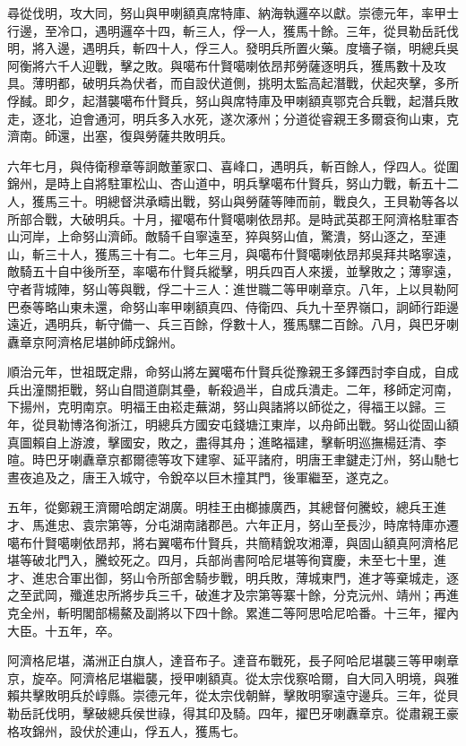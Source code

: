 \begin{pinyinscope}
尋從伐明，攻大同，努山與甲喇額真席特庫、納海執邏卒以獻。崇德元年，率甲士行邊，至冷口，遇明邏卒十四，斬三人，俘一人，獲馬十餘。三年，從貝勒岳託伐明，將入邊，遇明兵，斬四十人，俘三人。發明兵所置火藥。度墻子嶺，明總兵吳阿衡將六千人迎戰，擊之敗。與噶布什賢噶喇依昂邦勞薩逐明兵，獲馬數十及攻具。薄明都，破明兵為伏者，而自設伏道側，挑明太監高起潛戰，伏起夾擊，多所俘馘。即夕，起潛襲噶布什賢兵，努山與席特庫及甲喇額真鄂克合兵戰，起潛兵敗走，逐北，迫會通河，明兵多入水死，遂次涿州；分道從睿親王多爾袞徇山東，克濟南。師還，出塞，復與勞薩共敗明兵。

六年七月，與侍衛穆章等詗敵董家口、喜峰口，遇明兵，斬百餘人，俘四人。從圍錦州，是時上自將駐軍松山、杏山道中，明兵擊噶布什賢兵，努山力戰，斬五十二人，獲馬三十。明總督洪承疇出戰，努山與勞薩等陣而前，戰良久，王貝勒等各以所部合戰，大破明兵。十月，擢噶布什賢噶喇依昂邦。是時武英郡王阿濟格駐軍杏山河岸，上命努山濟師。敵騎千自寧遠至，猝與努山值，驚潰，努山逐之，至連山，斬三十人，獲馬三十有二。七年三月，與噶布什賢噶喇依昂邦吳拜共略寧遠，敵騎五十自中後所至，率噶布什賢兵縱擊，明兵四百人來援，並擊敗之；薄寧遠，守者背城陣，努山等與戰，俘二十三人：進世職二等甲喇章京。八年，上以貝勒阿巴泰等略山東未還，命努山率甲喇額真四、侍衛四、兵九十至界嶺口，詗師行距邊遠近，遇明兵，斬守備一、兵三百餘，俘數十人，獲馬騾二百餘。八月，與巴牙喇纛章京阿濟格尼堪帥師戍錦州。

順治元年，世祖既定鼎，命努山將左翼噶布什賢兵從豫親王多鐸西討李自成，自成兵出潼關拒戰，努山自間道劘其壘，斬殺過半，自成兵潰走。二年，移師定河南，下揚州，克明南京。明福王由崧走蕪湖，努山與諸將以師從之，得福王以歸。三年，從貝勒博洛徇浙江，明總兵方國安屯錢塘江東岸，以舟師出戰。努山從固山額真圖賴自上游渡，擊國安，敗之，盡得其舟；進略福建，擊斬明巡撫楊廷清、李暄。時巴牙喇纛章京都爾德等攻下建寧、延平諸府，明唐王聿鍵走汀州，努山馳七晝夜追及之，唐王入城守，令銳卒以巨木撞其門，後軍繼至，遂克之。

五年，從鄭親王濟爾哈朗定湖廣。明桂王由榔據廣西，其總督何騰蛟，總兵王進才、馬進忠、袁宗第等，分屯湖南諸郡邑。六年正月，努山至長沙，時席特庫亦遷噶布什賢噶喇依昂邦，將右翼噶布什賢兵，共簡精銳攻湘潭，與固山額真阿濟格尼堪等破北門入，騰蛟死之。四月，兵部尚書阿哈尼堪等徇寶慶，未至七十里，進才、進忠合軍出御，努山令所部舍騎步戰，明兵敗，薄城東門，進才等棄城走，逐之至武岡，殲進忠所將步兵三千，破進才及宗第等寨十餘，分克沅州、靖州；再進克全州，斬明閣部楊鰲及副將以下四十餘。累進二等阿思哈尼哈番。十三年，擢內大臣。十五年，卒。

阿濟格尼堪，滿洲正白旗人，達音布子。達音布戰死，長子阿哈尼堪襲三等甲喇章京，旋卒。阿濟格尼堪繼襲，授甲喇額真。從太宗伐察哈爾，自大同入明境，與雅賴共擊敗明兵於崞縣。崇德元年，從太宗伐朝鮮，擊敗明寧遠守邊兵。三年，從貝勒岳託伐明，擊破總兵侯世祿，得其印及騎。四年，擢巴牙喇纛章京。從肅親王豪格攻錦州，設伏於連山，俘五人，獲馬七。


\end{pinyinscope}
